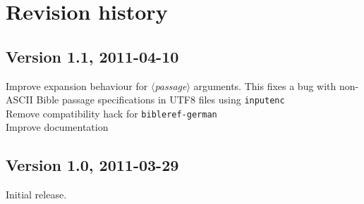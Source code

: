 \documentclass[DIV12,BCOR0mm]{scrartcl}
\newcommand{\param}[1]{$\langle${\normalfont\itshape #1\/}$\rangle$}
\begin{document}
\appendix
\section{Revision history}

\subsection*{Version 1.1, 2011-04-10}
Improve expansion behaviour for \param{passage} arguments. This fixes a bug with
non-ASCII Bible passage specifications in UTF8 files using \texttt{inputenc}\\
Remove compatibility hack for \texttt{bibleref-german}\\
Improve documentation

\subsection*{Version 1.0, 2011-03-29}
Initial release.
\end{document}
